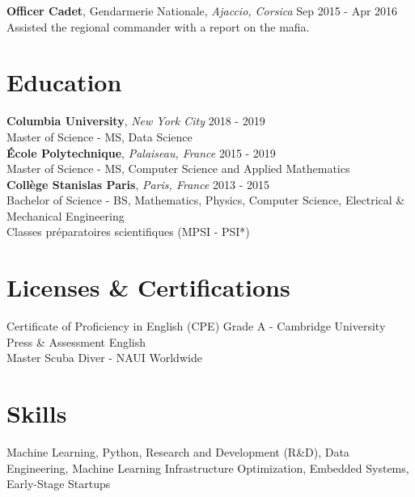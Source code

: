 \documentclass[a4paper,10pt]{article}
\begin{document}
    \noindent\textbf{Officer Cadet}, Gendarmerie Nationale, \textit{Ajaccio, Corsica} \hfill Sep 2015 - Apr 2016\\
    Assisted the regional commander with a report on the mafia.

    \section*{Education}

    \noindent\textbf{Columbia University}, \textit{New York City} \hfill 2018 - 2019\\
    Master of Science - MS, Data Science\\

    \noindent\textbf{École Polytechnique}, \textit{Palaiseau, France} \hfill 2015 - 2019\\
    Master of Science - MS, Computer Science and Applied Mathematics\\

    \noindent\textbf{Collège Stanislas Paris}, \textit{Paris, France} \hfill 2013 - 2015\\
    Bachelor of Science - BS, Mathematics, Physics, Computer Science, Electrical \& Mechanical Engineering\\
    Classes préparatoires scientifiques (MPSI - PSI*)

    \section*{Licenses \& Certifications}
    Certificate of Proficiency in English (CPE) Grade A - Cambridge University Press \& Assessment English \hfill \\
    Master Scuba Diver - NAUI Worldwide \hfill

    \section*{Skills}
    Machine Learning, Python, Research and Development (R\&D), Data Engineering, Machine Learning Infrastructure Optimization, Embedded Systems, Early-Stage Startups
\end{document}
